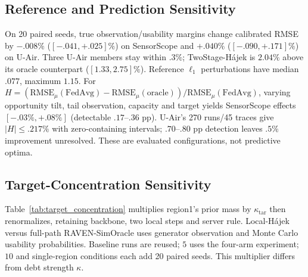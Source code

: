 \subsection{Reference and Prediction Sensitivity}
On 20 paired seeds, true observation/usability margins change calibrated
RMSE by $-.008\%$ ($[-.041,+.025]\%$) on SensorScope and $+.040\%$
($[-.090,+.171]\%$) on U-Air. Three U-Air members stay within $.3\%$;
TwoStage-H\'ajek is $2.04\%$ above its oracle counterpart ($[1.33,2.75]\%$).
Reference $\ell_1$ perturbations have median $.077$, maximum $1.15$.
For $H=(\mathrm{RMSE}_{\mu}(\mathrm{FedAvg})-\mathrm{RMSE}_{\mu}(\mathrm{oracle}))/
\mathrm{RMSE}_{\mu}(\mathrm{FedAvg})$, varying opportunity tilt, tail observation,
capacity and target yields SensorScope effects $[-.03\%,+.08\%]$ (detectable
$.17$--$.36$ pp). U-Air's 270 runs/45 traces give $|H|\le.217\%$ with
zero-containing intervals; $.70$--$.80$ pp detection leaves $.5\%$ improvement
unresolved. These are evaluated configurations, not predictive optima.

\subsection{Target-Concentration Sensitivity}



Table~\ref{tab:target_concentration} multiplies region1's prior mass by
$\kappa_{\mathrm{tar}}$ then renormalizes, retaining backbone, two local steps
and server rule. Local-H\'ajek versus full-path RAVEN-SimOracle uses generator
observation and Monte Carlo usability probabilities. Baseline runs are reused;
$5$ uses the four-arm experiment; $10$ and single-region conditions each add
20 paired seeds. This multiplier differs from debt strength $\kappa$.




